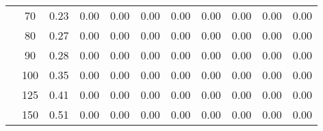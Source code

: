 \begin{table}[t]
\begin{center}
\begin{subtable}[c]{\textwidth}
\begin{center}
\begin{tabular}{rcccccccccc}
                                        & \multicolumn{1}{c|}{70}  & \num{0.23}  & \num{0.00}  & \num{0.00}  & \num{0.00}  & \num{0.00}  & \num{0.00}  & \num{0.00}  & \num{0.00}  & \num{0.00}  \\
                                        & \multicolumn{1}{c|}{80}  & \num{0.27}  & \num{0.00}  & \num{0.00}  & \num{0.00}  & \num{0.00}  & \num{0.00}  & \num{0.00}  & \num{0.00}  & \num{0.00}  \\
                                        & \multicolumn{1}{c|}{90}  & \num{0.28}  & \num{0.00}  & \num{0.00}  & \num{0.00}  & \num{0.00}  & \num{0.00}  & \num{0.00}  & \num{0.00}  & \num{0.00}  \\
                                        & \multicolumn{1}{c|}{100}  & \num{0.35}  & \num{0.00}  & \num{0.00}  & \num{0.00}  & \num{0.00}  & \num{0.00}  & \num{0.00}  & \num{0.00}  & \num{0.00}  \\
                                        & \multicolumn{1}{c|}{125}  & \num{0.41}  & \num{0.00}  & \num{0.00}  & \num{0.00}  & \num{0.00}  & \num{0.00}  & \num{0.00}  & \num{0.00}  & \num{0.00}  \\
                                        & \multicolumn{1}{c|}{150}  & \num{0.51}  & \num{0.00}  & \num{0.00}  & \num{0.00}  & \num{0.00}  & \num{0.00}  & \num{0.00}  & \num{0.00}  & \num{0.00}  \\
                                    \end{tabular}
            \end{center}
        \end{subtable}

        \vspace{5mm}


\end{center}
\end{table}
